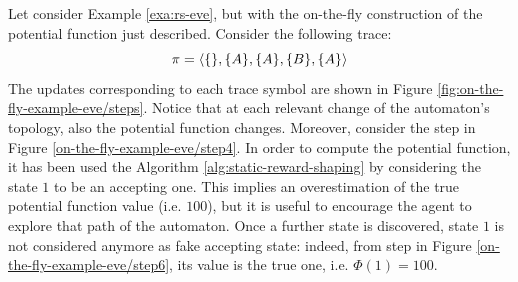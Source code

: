 \begin{example}
	Let consider Example \ref{exa:rs-eve}, but with the on-the-fly construction of the potential function just described. Consider the following trace:
	\[
	\pi = \langle \{\}, \{A\},\{A\},\{B\},\{A\} \rangle
	\]
	The updates corresponding to each trace symbol are shown in Figure \ref{fig:on-the-fly-example-eve/steps}. Notice that at each relevant change of the automaton's topology, also the potential function changes. Moreover, consider the step in Figure \ref{on-the-fly-example-eve/step4}. In order to compute the potential function, it has been used the Algorithm \ref{alg:static-reward-shaping} by considering the state $1$ to be an accepting one. This implies an overestimation of the true potential function value (i.e. $100$), but it is useful to encourage the agent to explore that path of the automaton. Once a further state is discovered, state $1$ is not considered anymore as fake accepting state: indeed, from step in Figure \ref{on-the-fly-example-eve/step6}, its value is the true one, i.e. $\Phi(1) = 100$. 
	

\end{example}

